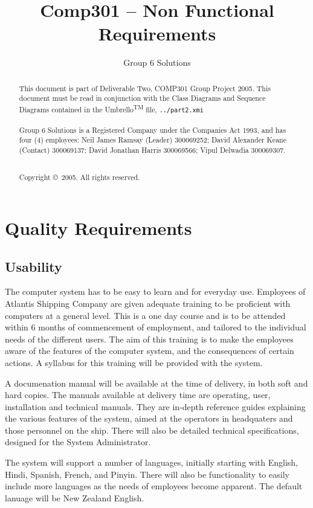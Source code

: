 \documentclass[a4paper,10pt]{report}
\title{Comp301 -- Non Functional Requirements}
\author{Group 6 Solutions}
\begin{document}
\maketitle

\begin{abstract}
This document is part of Deliverable Two, COMP301 Group Project 2005. This document must be read in conjunction with the Class Diagrams and Sequence Diagrams contained in the Umbrello\textsuperscript{TM} file, \verb+../part2.xmi+ \\ \\ Group 6 Solutions is a Registered Company under the Companies Act 1993, and has four (4) employees: Neil James Ramsay (Leader) 300069252; David Alexander Keane (Contact) 300069137; David Jonathan Harris 300069566; Vipul Delwadia 300069307. \\ \\ \centerline{Copyright \copyright\ 2005. All rights reserved.}
\end{abstract}


\chapter{Quality Requirements}
\section{Usability}
The computer system has to be easy to learn and for everyday use.  Employees of Atlantis Shipping Company are given adequate training to be proficient with computers at a general level.  This is a one day course and is to be attended within 6 months of commencement of employment, and tailored to the individual needs of the different users.  The aim of this training is to make the employees aware of the features of the computer system, and the consequences of certain actions. A syllabus for this training will be provided with the system.

A documenation manual will be available at the time of delivery, in both soft and hard copies. The manuals available at delivery time are operating, user, installation and technical manuals.  They are in-depth reference guides explaining the various features of the system, aimed at the operators in headquaters and those personnel on the ship.  There will also be detailed technical specifications, designed for the System Administrator.

The system will support a number of languages, initially starting with English, Hindi, Spanish, French, and Pinyin.  There will also be functionality to easily include more languages as the needs of employees become apparent.  The default lanuage will be New Zealand English.
\end{document}
